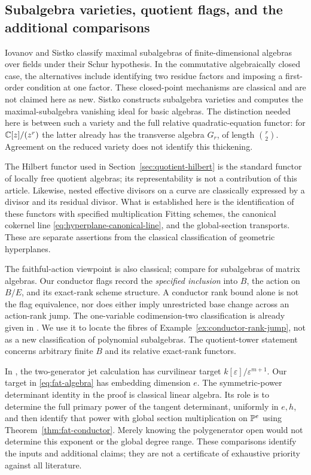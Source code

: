 \subsection*{Subalgebra varieties, quotient flags, and the additional comparisons}
Iovanov and Sistko \cite[Theorem 0.1]{IS} classify maximal subalgebras
of finite-dimensional algebras over fields under their Schur hypothesis.
In the commutative algebraically closed case, the alternatives include
identifying two residue factors and imposing a first-order condition
at one factor. These closed-point mechanisms are classical and are
not claimed here as new.
Sistko \cite[Definition 3.1, Theorems 1.1 and 4.1]{Sistko} constructs
subalgebra varieties and computes the maximal-subalgebra vanishing
ideal for basic algebras. The distinction needed here is between
such a variety and the full relative quadratic-equation functor:
for $\mathbb C[z]/(z^r)$ the latter already has the transverse algebra
$G_r$, of length $\binom r2$. Agreement on the reduced variety does
not identify this thickening.

The Hilbert functor used in Section~\ref{sec:quotient-hilbert} is the
standard functor of locally free quotient algebras; its representability
is not a contribution of this article. Likewise, nested effective
divisors on a curve are classically expressed by a divisor and its
residual divisor. What is established here is the identification
of these functors with specified multiplication Fitting schemes,
the canonical cokernel line \eqref{eq:hyperplane-canonical-line},
and the global-section transports. These are separate assertions
from the classical classification of geometric hyperplanes.

The faithful-action viewpoint is also classical; compare
\cite[Proposition 3.4]{Sistko} for subalgebras of matrix algebras.
Our conductor flags record the \emph{specified inclusion} into $B$,
the action on $B/E$, and its exact-rank scheme structure. A conductor
rank bound alone is not the flag equivalence, nor does either imply
unrestricted base change across an action-rank jump.
The one-variable codimension-two classification is already given
in \cite[Theorem 39]{GLTU}. We use it to locate the fibres of
Example~\ref{ex:conductor-rank-jump}, not as a new classification
of polynomial subalgebras. The quotient-tower statement concerns
arbitrary finite $B$ and its relative exact-rank functors.

In \cite[Example 4.16]{ABHS}, the two-generator jet calculation has
curvilinear target $k[\varepsilon]/\varepsilon^{m+1}$.
Our target in \eqref{eq:fat-algebra} has embedding dimension $e$.
The symmetric-power determinant identity in the proof is classical
linear algebra. Its role is to determine the full primary power of
the tangent determinant, uniformly in $e,h$, and then identify that
power with global section multiplication on $\mathbb P^e$ using
Theorem~\ref{thm:fat-conductor}. Merely knowing the polygenerator
open would not determine this exponent or the global degree range.
These comparisons identify the inputs and additional claims; they
are not a certificate of exhaustive priority against all literature.

